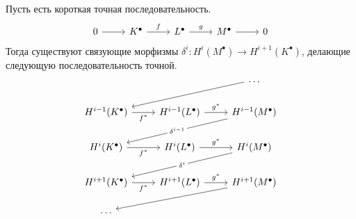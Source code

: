 \documentclass[../main.tex]{subfiles}
\begin{document}
\begin{to_suj}\label{B:zigzag_lemma}
Пусть есть короткая точная последовательность.
\begin{equation*}
    \begin{tikzcd}
	0 & {K^\bullet} & {L^\bullet} & {M^\bullet} & 0
	\arrow[from=1-1, to=1-2]
	\arrow["f", from=1-2, to=1-3]
	\arrow["g", from=1-3, to=1-4]
	\arrow[from=1-4, to=1-5]
\end{tikzcd}
\end{equation*}
Тогда существуют связующие морфизмы $\delta^i: H^i(M^\bullet) \to H^{i+1}(K^\bullet)$, делающие следующую последовательность точной.
\begin{equation*}
    \begin{tikzcd}
	&& \ldots \\
	{H^{i-1}(K^\bullet)} & {H^{i-1}(L^\bullet)} & {H^{i-1}(M^\bullet)} \\
	{H^i(K^\bullet)} & {H^i(L^\bullet)} & {H^i(M^\bullet)} \\
	{H^{i+1}(K^\bullet)} & {H^{i+1}(L^\bullet)} & {H^{i+1}(M^\bullet)} \\
	\ldots
	\arrow[from=1-3, to=2-1]
	\arrow["{f^*}"', from=2-1, to=2-2]
	\arrow["{g^*}", from=2-2, to=2-3]
	\arrow["{\delta^{i-1}}"{description}, from=2-3, to=3-1]
	\arrow["{f^*}"', from=3-1, to=3-2]
	\arrow["{g^*}", from=3-2, to=3-3]
	\arrow["{\delta^i}"{description}, from=3-3, to=4-1]
	\arrow["{f^*}"', from=4-1, to=4-2]
	\arrow["{g^*}", from=4-2, to=4-3]
	\arrow[from=4-3, to=5-1]
\end{tikzcd}
\end{equation*}
\end{to_suj}
\end{document}
